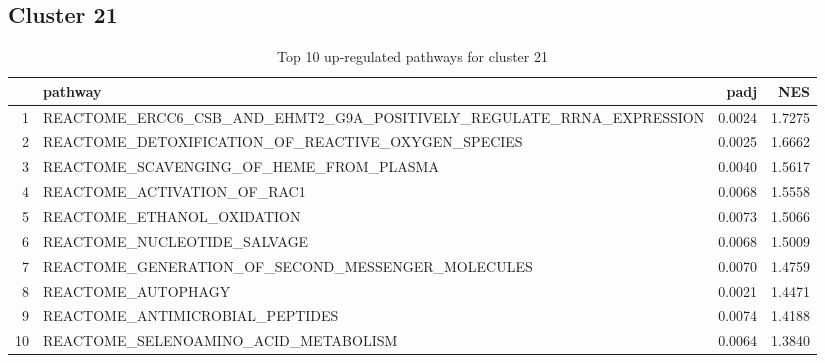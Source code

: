 \documentclass{article}
\begin{document}
\subsection{Cluster 21 }
\begin{table}[H]
\centering
\begin{tabularx}{\textwidth}{rlrr}
  \hline
 & pathway & padj & NES \\ 
  \hline
1 & REACTOME\_ERCC6\_CSB\_AND\_EHMT2\_G9A\_POSITIVELY\_REGULATE\_RRNA\_EXPRESSION & 0.0024 & 1.7275 \\ 
  2 & REACTOME\_DETOXIFICATION\_OF\_REACTIVE\_OXYGEN\_SPECIES & 0.0025 & 1.6662 \\ 
  3 & REACTOME\_SCAVENGING\_OF\_HEME\_FROM\_PLASMA & 0.0040 & 1.5617 \\ 
  4 & REACTOME\_ACTIVATION\_OF\_RAC1 & 0.0068 & 1.5558 \\ 
  5 & REACTOME\_ETHANOL\_OXIDATION & 0.0073 & 1.5066 \\ 
  6 & REACTOME\_NUCLEOTIDE\_SALVAGE & 0.0068 & 1.5009 \\ 
  7 & REACTOME\_GENERATION\_OF\_SECOND\_MESSENGER\_MOLECULES & 0.0070 & 1.4759 \\ 
  8 & REACTOME\_AUTOPHAGY & 0.0021 & 1.4471 \\ 
  9 & REACTOME\_ANTIMICROBIAL\_PEPTIDES & 0.0074 & 1.4188 \\ 
  10 & REACTOME\_SELENOAMINO\_ACID\_METABOLISM & 0.0064 & 1.3840 \\ 
   \hline
\end{tabularx}
\caption{Top 10 up-regulated pathways for cluster 21} 
\label{tab:q3_2_21}
\end{table}
\end{document}
